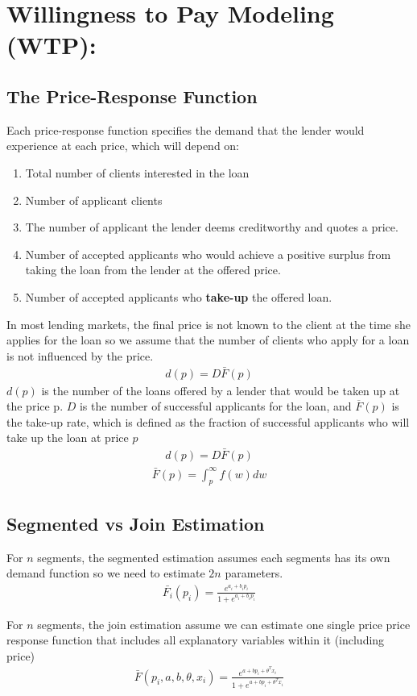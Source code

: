 
\chapter{Willingness to Pay Modeling (WTP): }
\section{The Price-Response Function}
Each price-response function specifies the demand that the lender would experience at each price, which will depend on:
\begin{enumerate}
    \item Total number of clients interested in the loan
    \item Number of applicant clients
    \item The number of applicant the lender deems creditworthy and quotes a price.
    \item Number of accepted applicants who would achieve a positive surplus from taking the loan from the lender at the offered price.
    \item Number of accepted applicants who \textbf{take-up} the offered loan.
\end{enumerate}
In most lending markets, the final price is not known to the client at the time she applies for the loan so we assume that the number of clients who apply for a loan is not influenced by the price.
\begin{align}
d(p)=D\bar{F}(p)
\end{align}
$d(p)$ is the number of the loans offered by a lender that would be taken up at the price p. $D$ is the number of successful applicants for the loan, and $\overline{F}(p)$ is the take-up rate, which is defined as the fraction of successful applicants who will take up the loan at price $p$
\begin{align}
d(p)=D\bar{F}(p)
\end{align}
\begin{align}
\bar{F}(p)=\int^\infty_p f(w)dw
\end{align}
\section{Segmented vs Join Estimation}
For $n$ segments, the segmented estimation assumes each segments has its own demand function so we need to estimate $2n$ parameters.
\begin{align}
\bar{F_i}(p_i)=\frac{e^{a_i+b_i p_i}}{1+e^{a_i+b_i p_i}}
\end{align}

For $n$ segments, the join estimation assume we can estimate one single price price response function that includes all explanatory variables within it (including price)
\begin{align}
\bar{F}(p_i,a,b,\theta,x_i)=\frac{e^{a+b p_i+\theta^T x_i}}{1+e^{a+b p_i+\theta^T x_i}}
\end{align}